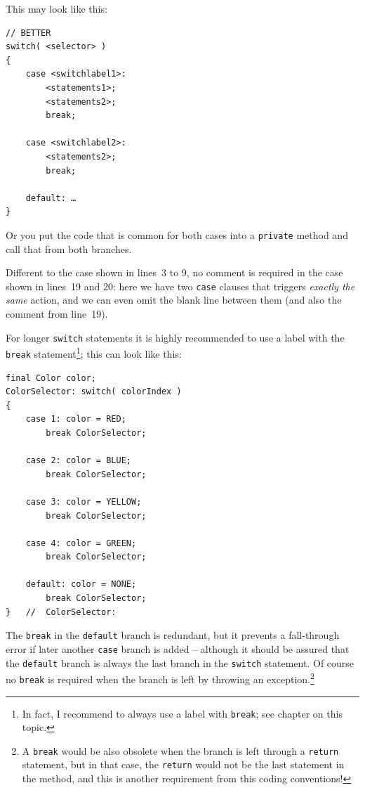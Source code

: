 This may look like this:
\begin{lstlisting}
// BETTER
switch( <selector> )
{
    case <switchlabel1>:
        <statements1>;
        <statements2>;
        break;

    case <switchlabel2>:
        <statements2>;
        break;

    default: …
}
\end{lstlisting}
Or you put the code that is common for both cases into a \lstinline|private| method and call that from both branches. 

Different to the case shown in lines~3 to 9, no comment is required in the case shown in lines~19 and 20: here we have two \lstinline|case| clauses that triggers \textit{exactly the same} action, and we can even omit the blank line between them (and also the comment from line~19).

For longer \lstinline|switch| statements it is highly recommended to use a label with the \lstinline|break| statement\footnote{In fact, I recommend to always use a label with \lstinline|break|; see chapter  on this topic.}; this can look like this:
\begin{lstlisting}
final Color color;
ColorSelector: switch( colorIndex )
{
    case 1: color = RED; 
        break ColorSelector;
        
    case 2: color = BLUE; 
        break ColorSelector;
        
    case 3: color = YELLOW; 
        break ColorSelector;
        
    case 4: color = GREEN; 
        break ColorSelector;
        
    default: color = NONE; 
        break ColorSelector;
}   //  ColorSelector:
\end{lstlisting}

The \lstinline|break| in the \lstinline|default| branch is redundant, but it prevents a fall-through error if later another \lstinline|case| branch is added – although it should be assured that the \lstinline|default| branch is always the last branch in the \lstinline|switch| statement. Of course no \lstinline|break| is required when the branch is left by throwing an exception.\footnote{A \lstinline|break| would be also obsolete when the branch is left through a \lstinline|return| statement, but in that case, the \lstinline|return| would not be the last statement in the method, and this is another requirement from this coding conventions!}

